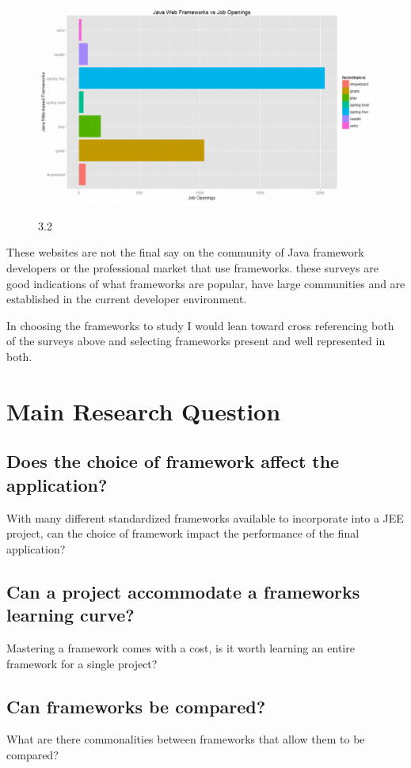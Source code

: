 \documentclass[]{report}
\begin{document}
		\begin{figure}[h]
			\includegraphics[width=.7\textwidth]{img2.png}
			\begin{center}
				\figurename{ 3.2}
			\end{center}
		\end{figure}

\newpage

	These websites are not the final say on the community of Java framework developers or the professional market that use frameworks. these surveys are good indications of what frameworks are popular, have large communities and are established in the current developer environment.
	
	In choosing the frameworks to study I would lean toward cross referencing both of the surveys above and selecting frameworks present and well represented in both. 

\section{Main Research Question}
	\subsection{Does the choice of framework affect the application?}
	With many different standardized frameworks available to incorporate into a JEE project, can the choice of framework impact the performance of the final application? 
	\subsection{Can a project accommodate a frameworks learning curve?}
	Mastering a framework comes with a cost, is it worth learning an entire framework for a single project?
	\subsection{Can frameworks be compared?}
	What are there commonalities between frameworks that allow them to be compared?
\end{document}
